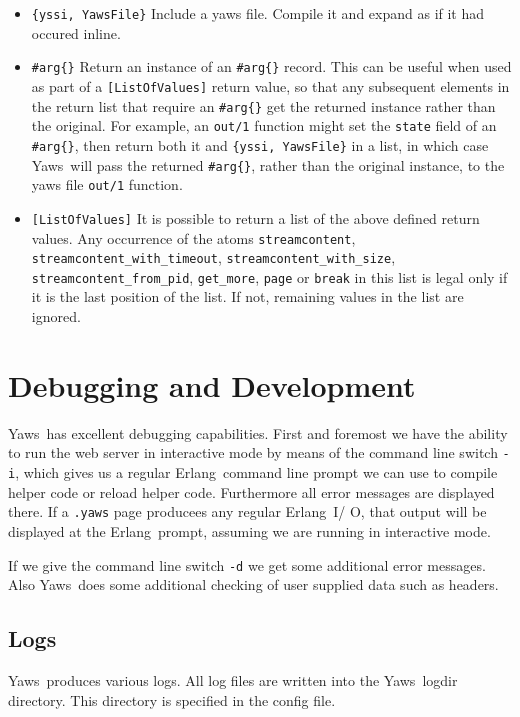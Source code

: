 \documentclass[11pt,oneside,english]{book}
\newcommand{\Erlang}            %
        {{\sc Erlang}}
\newcommand{\Yaws}            %
        {{\sc Yaws}}
\begin{document}
\begin{itemize}
\item \verb+{yssi, YawsFile}+ Include a yaws file. Compile it and expand as if it had
occured inline.

\item \verb+#arg{}+
Return an instance of an \verb+#arg{}+ record. This can be useful when used
as part of a \verb+[ListOfValues]+ return value, so that any subsequent
elements in the return list that require an \verb+#arg{}+ get the returned
instance rather than the original. For example, an \verb+out/1+ function
might set the \verb+state+ field of an \verb+#arg{}+, then return both it and
\verb+{yssi, YawsFile}+ in a list, in which case \Yaws\ will pass the returned
\verb+#arg{}+, rather than the original instance, to the yaws file
\verb+out/1+ function.

\item \verb+[ListOfValues]+ It is possible to return a list of the above defined
  return values. Any occurrence of the atoms \verb+streamcontent+,
  \verb+streamcontent_with_timeout+,
  \verb+streamcontent_with_size+,\\
  \verb+streamcontent_from_pid+, \verb+get_more+, \verb+page+ or \verb+break+ in
  this list is legal only if it is the last position of the list. If not,
  remaining values in the list are ignored.

\end{itemize}



\chapter{Debugging and Development}

\Yaws\ has excellent debugging capabilities. First and foremost we
have the ability to run the web server in interactive mode by means of
the command line switch \verb+-i+, which gives us a regular
\Erlang\ command line prompt we can use to compile helper code or
reload helper code. Furthermore all error messages are displayed
there.  If a \verb+.yaws+ page producees any regular \Erlang\ I\slash
O, that output will be displayed at the \Erlang\ prompt, assuming we
are running in interactive mode.

If we give the command line switch \verb+-d+ we get some additional
error messages. Also \Yaws\ does some additional checking of user
supplied data such as headers.

\section{Logs}
\Yaws\ produces various logs. All log files are written into the
\Yaws\ logdir directory. This directory is specified in the config
file.
\end{document}
